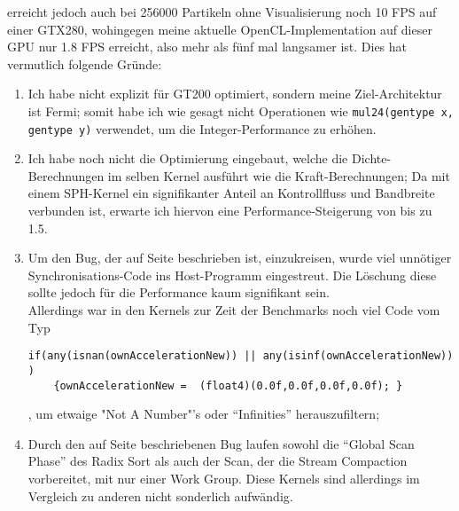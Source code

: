 	\cite{Goswami2010} erreicht jedoch auch bei 256000 Partikeln ohne Visualisierung noch 10 FPS auf einer GTX280,
	wohingegen meine aktuelle OpenCL-Implementation auf dieser GPU nur 1.8 FPS erreicht, 
	also mehr als fünf mal langsamer ist.
	Dies hat vermutlich folgende Gründe:
	\begin{enumerate}
		\item Ich habe nicht explizit für GT200 optimiert, sondern meine Ziel-Architektur ist Fermi;
		somit habe ich wie gesagt nicht Operationen wie \lstinline|mul24(gentype x, gentype y)| verwendet,
		um die Integer-Performance zu erhöhen.
		\item Ich habe noch nicht die Optimierung eingebaut, welche die Dichte-Berechnungen im selben
		Kernel ausführt wie die Kraft-Berechnungen; Da mit einem SPH-Kernel ein signifikanter 
		Anteil an Kontrollfluss und	Bandbreite verbunden ist, erwarte ich hiervon eine Performance-Steigerung von 
		bis zu 1.5.
		\item Um den Bug, der auf Seite \pageref{enum:oclSyncBug} beschrieben ist, einzukreisen, wurde viel unnötiger 
		Synchronisations-Code ins Host-Programm eingestreut. Die Löschung diese sollte jedoch
		für die Performance kaum signifikant sein.\\
		Allerdings war in den Kernels zur Zeit der Benchmarks noch viel Code vom Typ
		\begin{lstlisting}
if(any(isnan(ownAccelerationNew)) || any(isinf(ownAccelerationNew)) ) 
	{ownAccelerationNew =  (float4)(0.0f,0.0f,0.0f,0.0f); }
		\end{lstlisting}
		, um etwaige "Not A Number"'s oder "`Infinities"' herauszufiltern; 
		
		\item
		Durch den auf Seite \pageref{enum:oclSyncBug} beschriebenen Bug laufen sowohl die "`Global Scan Phase"'
		des Radix Sort als auch der Scan, der die Stream Compaction vorbereitet, mit nur einer Work Group.
		Diese Kernels sind allerdings im Vergleich zu anderen nicht sonderlich aufwändig.
		

\end{enumerate}
